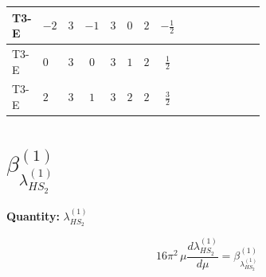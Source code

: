 \documentclass[8pt]{article}
\begin{document}
\begin{landscape}
\begin{longtable}{@{}llcccccc >{\raggedright\arraybackslash}p{0.21\linewidth} >{\raggedright\arraybackslash}p{0.21\linewidth} >{\raggedright\arraybackslash}p{0.21\linewidth}@{}}
\midrule
T3-E & $-2$ & $3$ & $-1$ & $3$ & $0$ & $2$ & $-\frac{1}{2}$ & \scriptsize\adjustbox{max width=\linewidth}{$\begin{gathered} +6 {g_2}^4\end{gathered}$} & \scriptsize\adjustbox{max width=\linewidth}{$\begin{gathered} +6 {\lambda_{HS_1}^{(A)}}^2\end{gathered}$} & \scriptsize\adjustbox{max width=\linewidth}{$\begin{gathered} +{\lambda_{HS_2}^{(1)}} (6 {\lambda_{12}^{(1)}}+4 {\lambda_{12}^{(\times)}})\end{gathered}$} \\
\midrule
T3-E & $0$ & $3$ & $0$ & $3$ & $1$ & $2$ & $\frac{1}{2}$ & \scriptsize\adjustbox{max width=\linewidth}{$\begin{gathered} +6 {g_2}^4\end{gathered}$} & \scriptsize\adjustbox{max width=\linewidth}{$\begin{gathered} +6 {\lambda_{HS_1}^{(A)}}^2\end{gathered}$} & \scriptsize\adjustbox{max width=\linewidth}{$\begin{gathered} +{\lambda_{HS_2}^{(1)}} (6 {\lambda_{12}^{(1)}}+4 {\lambda_{12}^{(\times)}})\end{gathered}$} \\
\midrule
T3-E & $2$ & $3$ & $1$ & $3$ & $2$ & $2$ & $\frac{3}{2}$ & \scriptsize\adjustbox{max width=\linewidth}{$\begin{gathered} +6 {g_2}^4\end{gathered}$} & \scriptsize\adjustbox{max width=\linewidth}{$\begin{gathered} +6 {\lambda_{HS_1}^{(A)}}^2\end{gathered}$} & \scriptsize\adjustbox{max width=\linewidth}{$\begin{gathered} +{\lambda_{HS_2}^{(1)}} (6 {\lambda_{12}^{(1)}}+4 {\lambda_{12}^{(\times)}})\end{gathered}$} \\
\midrule
\bottomrule
\end{longtable}
\clearpage
\section*{$\beta_{\lambda_{HS_2}^{(1)}}^{(1)}$}
\noindent\textbf{Quantity: }$\lambda_{HS_2}^{(1)}$\par\smallskip
\[16\pi^2\,\mu\frac{d \lambda_{HS_2}^{(1)}}{d\mu}=\beta_{\lambda_{HS_2}^{(1)}}^{(1)}\]

\end{landscape}
\end{document}
